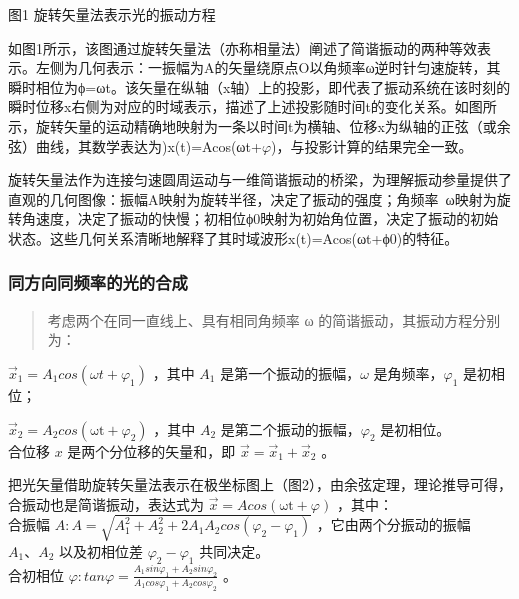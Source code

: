 \documentclass[
]{article}
\begin{document}
图1 旋转矢量法表示光的振动方程

如图1所示，该图通过旋转矢量法（亦称相量法）阐述了简谐振动的两种等效表示。左侧为几何表示：一振幅为A的矢量绕原点O以角频率ω逆时针匀速旋转，其瞬时相位为ϕ=ωt。该矢量在纵轴（x轴）上的投影，即代表了振动系统在该时刻的瞬时位移x右侧为对应的时域表示，描述了上述投影随时间t的变化关系。如图所示，旋转矢量的运动精确地映射为一条以时间t为横轴、位移x为纵轴的正弦（或余弦）曲线，其数学表达为)x(t)=Acos(ωt+\(\varphi\))，与投影计算的结果完全一致。

旋转矢量法作为连接匀速圆周运动与一维简谐振动的桥梁，为理解振动参量提供了直观的几何图像：振幅A映射为旋转半径，决定了振动的强度；角频率~ω映射为旋转角速度，决定了振动的快慢；初相位ϕ0\hspace{0pt}映射为初始角位置，决定了振动的初始状态。这些几何关系清晰地解释了其时域波形x(t)=Acos(ωt+ϕ0)的特征。

\hypertarget{ux540cux65b9ux5411ux540cux9891ux7387ux7684ux5149ux7684ux5408ux6210}{%
\subsubsection{同方向同频率的光的合成}\label{ux540cux65b9ux5411ux540cux9891ux7387ux7684ux5149ux7684ux5408ux6210}}

\begin{quote}
考虑两个在同一直线上、具有相同角频率 ω 的简谐振动，其振动方程分别为：
\end{quote}

\({\overrightarrow{x}}_{1} = A_{1}cos\left( \omega t + \varphi_{1} \right)\) ，其中 \(A_{1}\) 是第一个振动的振幅，\(\omega\) 是角频率，\(\varphi_{1}\) 是初相位；

\({\overrightarrow{x}}_{2} = A_{2}cos\left( \text{ωt} + \varphi_{2} \right)\) ，其中 \(A_{2}\) 是第二个振动的振幅，\(\varphi_{2}\) 是初相位。\\
合位移 \(x\) 是两个分位移的矢量和，即 \(\overrightarrow{x} = {\overrightarrow{x}}_{1} + {\overrightarrow{x}}_{2}\) 。

把光矢量借助旋转矢量法表示在极坐标图上（图2），由余弦定理，理论推导可得，合振动也是简谐振动，表达式为 \(\overrightarrow{x} = Acos(\text{ωt} + \varphi)\) ，其中：\\
合振幅 \(A:A = \sqrt{A_{1}^{2} + A_{2}^{2} + 2A_{1}A_{2}cos\left( \varphi_{2} - \varphi_{1} \right)}\) ，它由两个分振动的振幅 \(A_{1}、A_{2}\) 以及初相位差 \(\varphi_{2} - \varphi_{1}\) 共同决定。\\

合初相位 \(\varphi:tan\varphi = \frac{A_{1}sin\varphi_{1} + A_{2}sin\varphi_{2}}{A_{1}cos\varphi_{1} + A_{2}cos\varphi_{2}}\) 。
\end{document}
